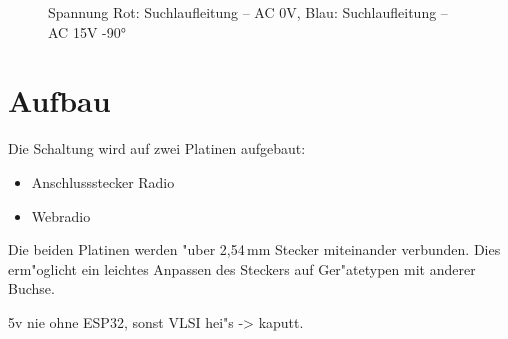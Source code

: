 \documentclass[ngerman,11pt,parskip=half] {scrartcl}
\begin{document}
\begin{figure}[H]
\centering
{}
\caption{Spannung Rot: Suchlaufleitung -- AC 0V, Blau: Suchlaufleitung -- AC 15V -90°} \label{fig:st}
\end{figure}






\section{Aufbau} \label{sec:aufbau}

Die Schaltung wird auf zwei Platinen aufgebaut:
\begin{itemize}
\item Anschlussstecker Radio
\item Webradio
\end{itemize}

Die beiden Platinen werden "uber 2,54\,mm Stecker miteinander verbunden. Dies erm"oglicht ein leichtes Anpassen des Steckers auf Ger"atetypen mit anderer Buchse.


5v nie ohne ESP32, sonst VLSI hei"s -> kaputt.
\end{document}
